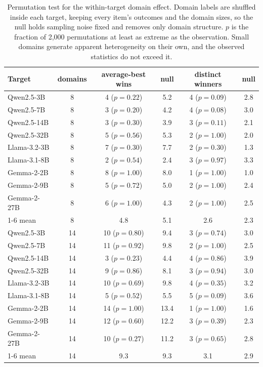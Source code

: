 \begin{table}[t]
\centering
\small
\caption{Permutation test for the within-target domain effect. Domain labels are shuffled inside each target, keeping every item's outcomes and the domain sizes, so the null holds sampling noise fixed and removes only domain structure. $p$ is the fraction of 2{,}000 permutations at least as extreme as the observation. Small domains generate apparent heterogeneity on their own, and the observed statistics do not exceed it.}
\label{tab:sel_domainperm}
\begin{tabular}{lccccc}
\toprule
Target & domains & average-best wins & null & distinct winners & null \\
\midrule
Qwen2.5-3B & 8 & 4 ($p=0.22$) & 5.2 & 4 ($p=0.09$) & 2.8 \\
Qwen2.5-7B & 8 & 3 ($p=0.20$) & 4.2 & 4 ($p=0.08$) & 3.0 \\
Qwen2.5-14B & 8 & 3 ($p=0.30$) & 3.9 & 3 ($p=0.11$) & 2.1 \\
Qwen2.5-32B & 8 & 5 ($p=0.56$) & 5.3 & 2 ($p=1.00$) & 2.0 \\
Llama-3.2-3B & 8 & 7 ($p=0.30$) & 7.7 & 2 ($p=0.30$) & 1.3 \\
Llama-3.1-8B & 8 & 2 ($p=0.54$) & 2.4 & 3 ($p=0.97$) & 3.3 \\
Gemma-2-2B & 8 & 8 ($p=1.00$) & 8.0 & 1 ($p=1.00$) & 1.0 \\
Gemma-2-9B & 8 & 5 ($p=0.72$) & 5.0 & 2 ($p=1.00$) & 2.4 \\
Gemma-2-27B & 8 & 6 ($p=1.00$) & 4.3 & 2 ($p=1.00$) & 2.5 \\
\cmidrule(lr){1-6}
mean & 8 & 4.8 & 5.1 & 2.6 & 2.3 \\
Qwen2.5-3B & 14 & 10 ($p=0.80$) & 9.4 & 3 ($p=0.74$) & 3.0 \\
Qwen2.5-7B & 14 & 11 ($p=0.92$) & 9.8 & 2 ($p=1.00$) & 2.5 \\
Qwen2.5-14B & 14 & 3 ($p=0.23$) & 4.4 & 4 ($p=0.86$) & 3.9 \\
Qwen2.5-32B & 14 & 9 ($p=0.86$) & 8.1 & 3 ($p=0.94$) & 3.0 \\
Llama-3.2-3B & 14 & 10 ($p=0.69$) & 9.8 & 4 ($p=0.35$) & 3.2 \\
Llama-3.1-8B & 14 & 5 ($p=0.52$) & 5.5 & 5 ($p=0.09$) & 3.6 \\
Gemma-2-2B & 14 & 14 ($p=1.00$) & 13.4 & 1 ($p=1.00$) & 1.6 \\
Gemma-2-9B & 14 & 12 ($p=0.60$) & 12.2 & 3 ($p=0.39$) & 2.3 \\
Gemma-2-27B & 14 & 10 ($p=0.27$) & 11.2 & 3 ($p=0.65$) & 2.8 \\
\cmidrule(lr){1-6}
mean & 14 & 9.3 & 9.3 & 3.1 & 2.9 \\
\bottomrule
\end{tabular}
\end{table}
